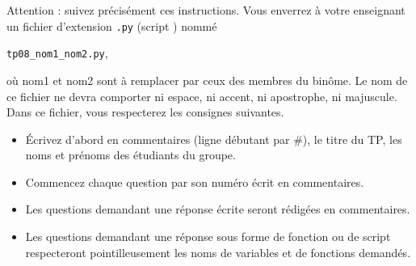 Attention : suivez précisément ces instructions. Vous enverrez à votre enseignant un fichier d'extension  \texttt{.py} (script \python) nommé
\begin{center}
  \texttt{tp08\_nom1\_nom2.py},
\end{center}
 où nom1 et nom2 sont à remplacer par ceux des membres du binôme. Le nom de ce 
fichier ne devra comporter ni espace, ni accent, ni apostrophe, ni majuscule.
Dans ce fichier, vous respecterez les consignes suivantes.
\begin{itemize}
  \item \'Ecrivez d'abord en commentaires (ligne débutant par \#), le titre du TP, les noms et prénoms des étudiants du groupe.
  \item Commencez chaque question par son numéro écrit en commentaires.
  \item Les questions demandant une réponse écrite seront rédigées en commentaires.
  \item Les questions demandant une réponse sous forme de fonction ou de script respecteront pointilleusement les noms de variables et de fonctions demandés.
\end{itemize}